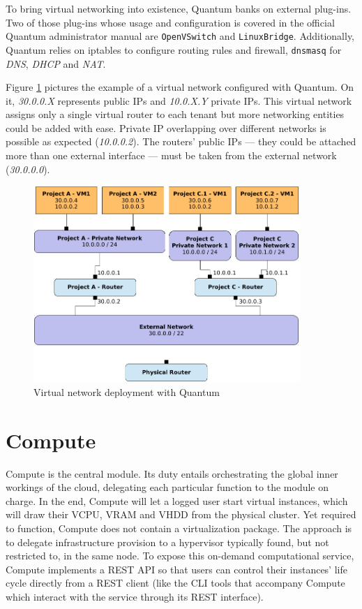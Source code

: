 To bring virtual networking into existence, Quantum banks on external plug-ins. Two of those plug-ins whose usage and configuration is covered in the official Quantum administrator manual \cite{quantumadminfolsom} are \texttt{OpenVSwitch} and \texttt{LinuxBridge}. Additionally, Quantum relies on iptables to configure routing rules and firewall, \texttt{dnsmasq} for \emph{DNS}, \emph{DHCP} and \emph{NAT}.

Figure \ref{fig:desplieguequantum} pictures the example of a virtual network configured with Quantum. On it, \emph{30.0.0.X} represents public IPs and \emph{10.0.X.Y} private IPs. This virtual network assigns only a single virtual router to each tenant but more networking entities could be added with ease. Private IP overlapping over different networks is possible as expected (\emph{10.0.0.2}). The routers' public IPs --- they could be attached more than one external interface --- must be taken from the external network (\emph{30.0.0.0}).

\begin{figure}[tbh]
\begin{center}
\includegraphics[width=0.9\textwidth]{imagenes/014.pdf}
 \caption{Virtual network deployment with Quantum}
\label{fig:desplieguequantum}
\end{center}
\end{figure}

\section{Compute}\label{sec:compute}
\noindent Compute is the central module. Its duty entails orchestrating the global inner workings of the cloud, delegating each particular function to the module on charge. In the end, Compute will let a logged user start virtual instances, which will draw their VCPU, VRAM and VHDD from the physical cluster. Yet required to function, Compute does not contain a virtualization package. The approach is to delegate infrastructure provision to a hypervisor typically found, but not restricted to, in the same node. To expose this on-demand computational service, Compute implements a REST API so that users can control their instances' life cycle directly from a REST client (like the CLI tools that accompany Compute which interact with the service through its REST interface).

